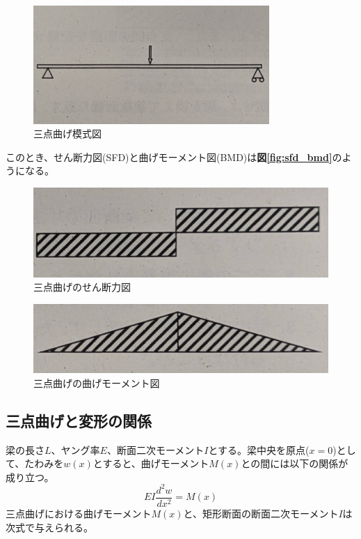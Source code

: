 \documentclass[a4j]{jarticle}
\begin{document}
\begin{figure}[H]
\centering
    \includegraphics[width=0.8\textwidth]{summer/ship-experiment/bend/picture/santenmage.png}
    \caption{三点曲げ模式図}
    \label{fig:santenmage}
\end{figure}

このとき、せん断力図(SFD)と曲げモーメント図(BMD)は\textbf{図\ref{fig:sfd_bmd}}のようになる。

\begin{figure}[H]
    \centering
    \includegraphics[width=0.5\linewidth]{summer/ship-experiment/bend/picture/sfd.png}
    \caption{三点曲げのせん断力図}
    \label{fig:sfd}
\end{figure}
\begin{figure}[H]
    \centering
    \includegraphics[width=0.5\linewidth]{summer/ship-experiment/bend/picture/bmd.png}
    \caption{三点曲げの曲げモーメント図}
    \label{fig:bmd}
\end{figure}


\subsection{三点曲げと変形の関係}
\label{sec:bending_theory}
梁の長さ$L$、ヤング率$E$、断面二次モーメント$I$とする。梁中央を原点($x=0$)として、たわみを$w(x)$とすると、曲げモーメント$M(x)$との間には以下の関係が成り立つ。
\begin{equation}
    EI\frac{d^2w}{dx^2} = M(x)
    \label{eq:beam_gov}
\end{equation}
三点曲げにおける曲げモーメント$M(x)$と、矩形断面の断面二次モーメント$I$は次式で与えられる。
\end{document}
